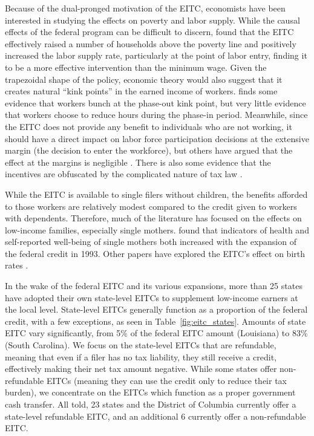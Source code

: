 \documentclass{article}
\begin{document}
Because of the dual-pronged motivation of the EITC, economists have been interested in studying the effects on poverty and labor supply. While the causal effects of the federal program can be difficult to discern, \cite{neumark2001using} found that the EITC effectively raised a number of households above the poverty line and positively increased the labor supply rate, particularly at the point of labor entry, finding it to be a more effective intervention than the minimum wage. Given the trapezoidal shape of the policy, economic theory would also suggest that it creates natural “kink points” in the earned income of workers.  \cite{saez2010taxpayers} finds some evidence that workers bunch at the phase-out kink point, but very little evidence that workers choose to reduce hours during the phase-in period. Meanwhile, since the EITC does not provide any benefit to individuals who are not working, it should have a direct impact on labor force participation decisions at the extensive margin (the decision to enter the workforce), but others have argued that the effect at the margins is negligible \citep{kleven2019eitc}. There is also some evidence that the incentives are obfuscated by the complicated nature of tax law \citep{chetty2013teaching}.

While the EITC is available to single filers without children, the benefits afforded to those workers are relatively modest compared to the credit given to workers with dependents. Therefore, much of the literature has focused on the effects on low-income families, especially single mothers. \cite{ evans2014giving} found that indicators of health and self-reported well-being of single mothers both increased with the expansion of the federal credit in 1993. Other papers have explored the EITC’s effect on birth rates \citep{baughman2003did}.

In the wake of the federal EITC and its various expansions, more than 25 states have adopted their own state-level EITCs to supplement low-income earners at the local level. State-level EITCs generally function as a proportion of the federal credit, with a few exceptions, as seen in Table~\ref{fig:eitc_states}. Amounts of state EITC vary significantly, from 5\% of the federal EITC amount (Louisiana) to 83\% (South Carolina). We focus on the state-level EITCs that are refundable, meaning that even if a filer has no tax liability, they still receive a credit, effectively making their net tax amount negative. While some states offer non-refundable EITCs (meaning they can use the credit only to reduce their tax burden), we concentrate on the EITCs which function as a proper government cash transfer. All told, 23 states and the District of Columbia currently offer a state-level refundable EITC, and an additional 6 currently offer a non-refundable EITC.
\end{document}
